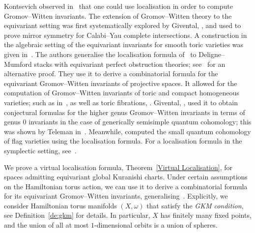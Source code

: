 \documentclass[AHL,Unicode,longabstracts]{cedram}
\makeatletter
\newcommand{\fcll}[1]{\left[#1\right]}
\newcommand{\Mbar}{\bar{\mathcal M}}
\newcommand{\bQ}{\mathbb{Q}}
\newcommand{\bT}{\mathbb{T}}
\DeclareMathOperator{\Pt}{pt}
\DeclareMathOperator{\Aut}{Aut}
\DeclareMathOperator{\GW}{GW}
\DeclareMathOperator{\eva}{ev}
\newcommand{\bfw}{\mathbf{w}}
\let\save@mathaccent\mathaccent
\newcommand*\if@single[3]{%
  \setbox0\hbox{${\mathaccent"0362{#1}}^H$}%
  \setbox2\hbox{${\mathaccent"0362{\kern0pt#1}}^H$}%
  \ifdim\ht0=\ht2 #3\else #2\fi
  }
\newcommand*\rel@kern[1]{\kern#1\dimexpr\macc@kerna}
\newcommand*\widebar[1]{\@ifnextchar^{{\wide@bar{#1}{0}}}{\wide@bar{#1}{1}}}
\newcommand*\wide@bar[2]{\if@single{#1}{\wide@bar@{#1}{#2}{1}}{\wide@bar@{#1}{#2}{2}}}
\newcommand*\wide@bar@[3]{%
  \begingroup
  \def\mathaccent##1##2{%
    \let\mathaccent\save@mathaccent
    \if#32 \let\macc@nucleus\first@char \fi
    \setbox\z@\hbox{$\macc@style{\macc@nucleus}_{}$}%
    \setbox\tw@\hbox{$\macc@style{\macc@nucleus}{}_{}$}%
    \dimen@\wd\tw@
    \advance\dimen@-\wd\z@
    \divide\dimen@ 3
    \@tempdima\wd\tw@
    \advance\@tempdima-\scriptspace
    \divide\@tempdima 10
    \advance\dimen@-\@tempdima
    \ifdim\dimen@>\z@ \dimen@0pt\fi
    \rel@kern{0.6}\kern-\dimen@
    \if#31
      \overline{\rel@kern{-0.6}\kern\dimen@\macc@nucleus\rel@kern{0.4}\kern\dimen@}%
      \advance\dimen@0.4\dimexpr\macc@kerna
      \let\final@kern#2%
      \ifdim\dimen@<\z@ \let\final@kern1\fi
      \if\final@kern1 \kern-\dimen@\fi
    \else
      \overline{\rel@kern{-0.6}\kern\dimen@#1}%
    \fi
  }%
  \macc@depth\@ne
  \let\math@bgroup\@empty \let\math@egroup\macc@set@skewchar
  \mathsurround\z@ \frozen@everymath{\mathgroup\macc@group\relax}%
  \macc@set@skewchar\relax
  \let\mathaccentV\macc@nested@a
  \if#31
    \macc@nested@a\relax111{#1}%
  \else
    \def\gobble@till@marker##1\endmarker{}%
    \futurelet\first@char\gobble@till@marker#1\endmarker
    \ifcat\noexpand\first@char A\else
      \def\first@char{}%
    \fi
    \macc@nested@a\relax111{\first@char}%
  \fi
  \endgroup
}
\let\oldbar\bar
\renewcommand*{\bar}[1]{{\mathchoice{\widebar{#1}}{\widebar{#1}}{\widebar{#1}}{\oldbar{#1}}}}
\let\oldin\in
\renewcommand{\in}{\mathchoice{\oldin}{\oldin}{\,\oldin\,}{\,\oldin\,}}
\makeatother
\begin{document}
Kontsevich observed in~\cite{Kon95} that one could use localisation in order to compute Gromov--Witten invariants. The extension of Gromov--Witten theory to the equivariant setting was first systematically explored by Givental, \cite{Giv96}, and used to prove mirror symmetry for Calabi--Yau complete intersections. A construction in the algebraic setting of the equivariant invariants for smooth toric varieties was given in~\cite{GP99}. The authors generalise the localisation formula of~\cite{AB84} to Deligne--Mumford stacks with equivariant perfect obstruction theories; see~\cite{Beh99} for an alternative proof. They use it to derive a combinatorial formula for the equivariant Gromov--Witten invariants of projective spaces. It allowed for the computation of Gromov--Witten invariants of toric and compact homogeneous varieties; such as in~\cite{Liu13,Spi99}, as well as toric fibrations, \cite{Br14}. Givental, \cite{Giv01b}, used it to obtain conjectural formulas for the higher genus Gromov--Witten invariants in terms of genus $0$ invariants in the case of generically semisimple quantum cohomology; this was shown by Teleman in~\cite{Te12}. Meanwhile, \cite{GiKi95} computed the small quantum cohomology of flag varieties using the localisation formula. For a localisation formula in the symplectic setting, see~\cite{CT10}.

We prove a virtual localisation formula, Theorem~\ref{Virtual Localisation}, for spaces admitting equivariant global Kuranishi charts. Under certain assumptions on the Hamiltonian torus action, we can use it to derive a combinatorial formula for its equivariant Gromov--Witten invariants, generalising~\cite[Theorem~78]{Liu13}. Explicitly, we consider Hamiltonian torus manifolds $(X,\omega)$ that satisfy the \emph{GKM condition}, see Definition~\ref{de:gkm} for details. In particular, $X$ has finitely many fixed points, and the union of all at most $1$-dimensional orbits is a union of spheres.

\end{document}

